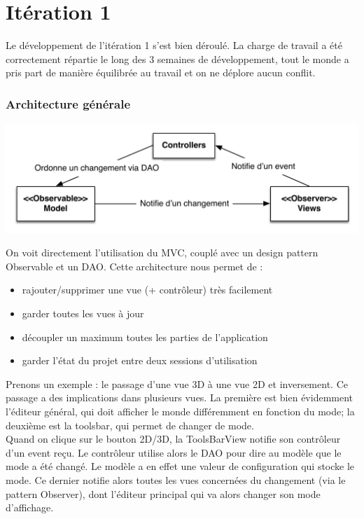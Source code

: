 \section{Itération 1}

Le développement de l'itération 1 s'est bien déroulé. La charge de travail a 
été correctement répartie le long des 3 semaines de développement, tout le monde
a pris part de manière équilibrée au travail et on ne déplore aucun conflit.\\


	\subsubsection{Architecture générale}
	\includegraphics{../uml/general_architecture.pdf}

	On voit directement l'utilisation du MVC, couplé avec un design pattern
	Observable et un DAO. Cette architecture nous permet de :
	\begin{itemize}
		\item rajouter/supprimer une vue (+ contrôleur) très facilement
		\item garder toutes les vues à jour
		\item découpler un maximum toutes les parties de l'application
		\item garder l'état du projet entre deux sessions d'utilisation
	\end{itemize}

	Prenons un exemple : le passage d'une vue 3D à une vue 2D et inversement.
	Ce passage a des implications dans plusieurs vues. La première est
	bien évidemment l'éditeur général, qui doit afficher le monde différemment
	en fonction du mode; la deuxième est la toolsbar, qui permet de changer de
	mode.\\

	Quand on clique sur le bouton 2D/3D, la ToolsBarView notifie son contrôleur
	d'un event reçu. Le contrôleur utilise alors le DAO pour dire au modèle que
	le mode a été changé. Le modèle a en effet une valeur de configuration qui
	stocke le mode. Ce dernier notifie alors toutes les vues concernées du 
	changement (via le pattern Observer), dont l'éditeur principal qui va alors
	changer son mode d'affichage.\\

